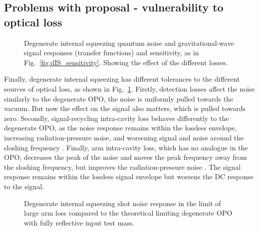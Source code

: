 \subsection{Problems with proposal - vulnerability to optical loss}
\label{sec:dIS_optical_loss}

\begin{figure}
	\centering
	\caption{Degenerate internal squeezing quantum noise and gravitational-wave signal responses (transfer functions) and sensitivity, as in Fig.~\ref{fig:dIS_sensitivity}. Showing the effect of the different losses.}
	\label{fig:dIS_loss_tolerance}
\end{figure}

Finally, degenerate internal squeezing has different tolerances to the different sources of optical loss, as shown in Fig.~\ref{fig:dIS_loss_tolerance}. %
Firstly, detection losses affect the noise similarly to the degenerate OPO, the noise is uniformly pulled towards the vacuum. But now the effect on the signal also matters, which is pulled towards zero. Secondly, signal-recycling intra-cavity loss behaves differently to the degenerate OPO, as the noise response remains within the lossless envelope, increasing radiation-pressure noise, and worsening signal and noise around the sloshing frequency . Finally, arm intra-cavity loss, which has no analogue in the OPO, decreases the peak of the noise and moves the peak frequency away from the sloshing frequency, but improves the radiation-pressure noise . The signal response remains within the lossless signal envelope but worsens the DC response to the signal.

\begin{figure}
	\centering
	\caption{Degenerate internal squeezing shot noise response in the limit of large arm loss compared to the theoretical limiting degenerate OPO with fully reflective input test mass.}
	\label{fig:}
\end{figure}

